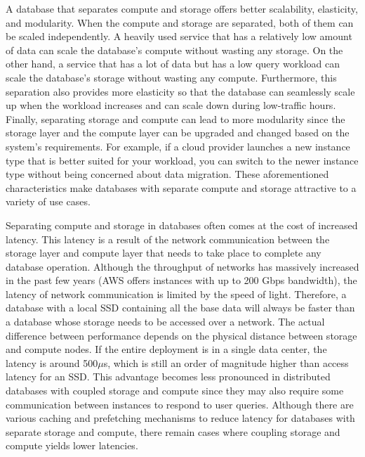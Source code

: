 \medskip
A database that separates compute and storage offers better scalability,
elasticity, and modularity. When the compute and storage are
separated, both of them can be scaled independently. A heavily used service
that has a relatively low amount of data can scale the database's compute without
wasting any storage. On the other hand, a service that has a lot of data but
has a low query workload can scale the database's storage without wasting any
compute. Furthermore, this separation also provides more elasticity so that the
database can seamlessly scale up when the workload increases and can scale down
during low-traffic hours. Finally, separating storage and compute can lead to
more modularity since the storage layer and the compute layer can be upgraded
and changed based on the system's requirements. For example, if a cloud provider
launches a new instance type that is better suited for your workload, you can
switch to the newer instance type without being concerned about data migration.
These aforementioned characteristics make databases with separate compute and
storage attractive to a variety of use cases.

\medskip
Separating compute and storage in databases often comes at the cost of increased
latency. This latency is a result of the network communication between the
storage layer and compute layer that needs to take place to complete any
database operation. Although the throughput of networks has massively increased
in the past few years (AWS offers instances with up to 200 Gbps bandwidth), the
latency of network communication is limited by the speed of light. Therefore, a
database with a local SSD containing all the base data will always be faster
than a database whose storage needs to be accessed over a network. The actual
difference between performance depends on the physical distance between storage
and compute nodes. If the entire deployment is in a single data center, the
latency is around 500$\mu$s, which is still an order of magnitude higher than access latency
for an SSD\cite{jiang2021fusionraid}. This advantage becomes less pronounced in
distributed databases with coupled storage and compute since they may also require
some communication between instances to respond to user queries.
Although there are various caching and prefetching mechanisms to reduce latency
for databases with separate storage and compute, there remain cases where
coupling storage and compute yields lower latencies.


